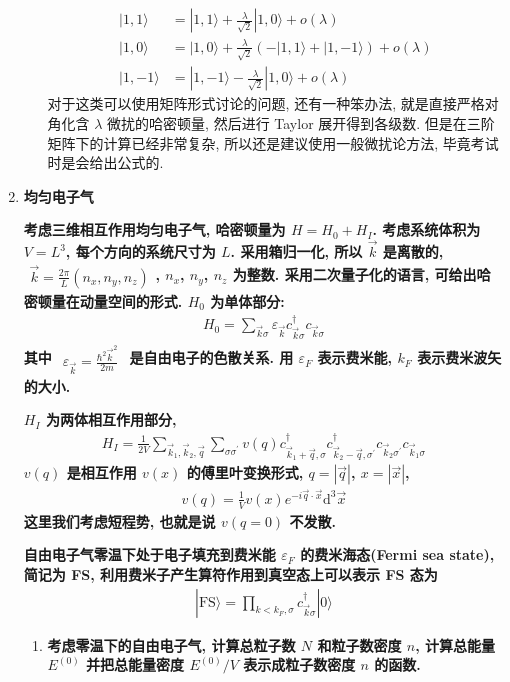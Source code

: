 \documentclass[../../main.tex]{subfiles}
\begin{document}
\begin{enumerate}
\begin{enumerate}
{{\begin{align*}
      |1,1\rangle &= |1,1\rangle + \frac{\lambda}{\sqrt{2}}|1,0\rangle + \mathit{o}(\lambda)\\
      |1,0\rangle &= |1,0\rangle + \frac{\lambda}{\sqrt{2}}(-|1,1\rangle + |1,-1\rangle) + \mathit{o}(\lambda)\\
      |1,-1\rangle &= |1,-1\rangle - \frac{\lambda}{\sqrt{2}}|1,0\rangle + \mathit{o}(\lambda)
    \end{align*}
    对于这类可以使用矩阵形式讨论的问题, 还有一种笨办法, 就是直接严格对角化含 $\lambda$ 微扰的哈密顿量, 然后进行 Taylor 展开得到各级数. 但是在三阶矩阵下的计算已经非常复杂, 所以还是建议使用一般微扰论方法, 毕竟考试时是会给出公式的.}}
  \end{enumerate}

  \item \textbf{均匀电子气}

\textbf{考虑三维相互作用均匀电子气, 哈密顿量为 $H = H_{0} + H_{I}$. 考虑系统体积为 $V = L^{3}$, 每个方向的系统尺寸为 $L$. 采用箱归一化, 所以 $\vec{k}$ 是离散的, $\begin{aligned}\vec{k} = \frac{2\pi}{L}(n_{x},n_{y},n_{z})\end{aligned}$, $n_{x}$, $n_{y}$, $n_{z}$ 为整数. 采用二次量子化的语言, 可给出哈密顿量在动量空间的形式. $H_{0}$ 为单体部分:}
  \begin{align*}
    H_{0} = \sum_{\vec{k}\sigma}\varepsilon_{\vec{k}}c_{\vec{k}\sigma}^{\dagger}c_{\vec{k}\sigma}
  \end{align*}
\textbf{其中 $\begin{aligned}\varepsilon_{\vec{k}} = \frac{\hbar^{2}\vec{k}^{2}}{2m}\end{aligned}$ 是自由电子的色散关系. 用 $\varepsilon_{F}$ 表示费米能, $k_{F}$ 表示费米波矢的大小.}

  \textbf{$H_{I}$ 为两体相互作用部分,
  \begin{align*}
    H_{I} = \frac{1}{2V}\sum_{\vec{k}_{1},\vec{k}_{2},\vec{q}}\sum_{\sigma\sigma^{\prime}}v(q)c_{\vec{k}_{1}+\vec{q},\sigma}^{\dagger}c_{\vec{k}_{2}-\vec{q},\sigma^{\prime}}^{\dagger}c_{\vec{k}_{2}\sigma^{\prime}}c_{\vec{k}_{1}\sigma}
  \end{align*}
  $v(q)$ 是相互作用 $v(x)$ 的傅里叶变换形式, $q = |\vec{q}|$, $x = |\vec{x}|$,
  \begin{align*}
    v(q) = \frac{1}{V}v(x)e^{-i\vec{q}\cdot\vec{x}}\mathrm{d}^{3}\vec{x}
  \end{align*}
  这里我们考虑短程势, 也就是说 $v(q=0)$ 不发散.}

  \textbf{自由电子气零温下处于电子填充到费米能 $\varepsilon_{F}$ 的费米海态(Fermi sea state), 简记为 FS, 利用费米子产生算符作用到真空态上可以表示 FS 态为
  \begin{align*}
    |\text{FS}\rangle = \prod_{k < k_{F},\sigma}c_{\vec{k}\sigma}^{\dagger}|0\rangle
  \end{align*}}
  \begin{enumerate}
    \item \textbf{考虑零温下的自由电子气, 计算总粒子数 $N$ 和粒子数密度 $n$, 计算总能量 $E^{(0)}$ 并把总能量密度 $E^{(0)}/V$ 表示成粒子数密度 $n$ 的函数. }
    

\end{enumerate}
\end{enumerate}
\end{document}
